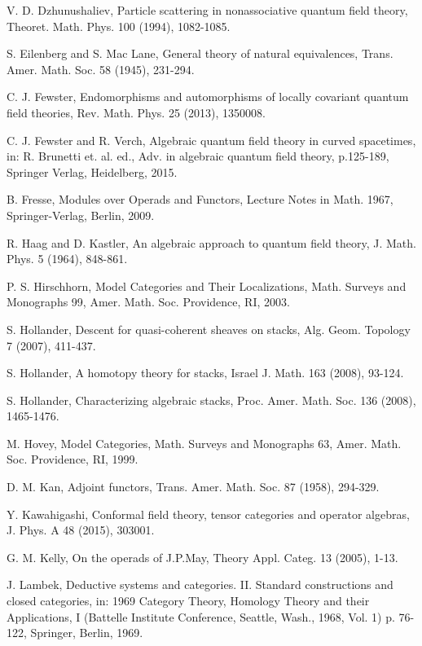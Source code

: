 \documentclass[11pt]{amsbook}
\numberwithin{section}{chapter}
\numberwithin{subsection}{section}
\numberwithin{equation}{section}
\theoremstyle{plain}
\theoremstyle{definition}
\begin{document}
\begin{thebibliography}{AAAAAA}
V. D. Dzhunushaliev, Particle scattering in nonassociative quantum field theory, Theoret. Math. Phys. 100 (1994), 1082-1085.

S. Eilenberg and S. Mac Lane, General theory of natural equivalences, Trans. Amer. Math. Soc. 58 (1945), 231-294.

C. J. Fewster, Endomorphisms and automorphisms of locally covariant quantum field theories, Rev. Math. Phys. 25 (2013), 1350008.

C. J. Fewster and R. Verch, Algebraic quantum field theory in curved spacetimes, in: R. Brunetti et. al. ed., Adv. in algebraic quantum field theory, p.125-189, Springer Verlag, Heidelberg, 2015.

B. Fresse, Modules over Operads and Functors, Lecture Notes in Math. 1967, Springer-Verlag, Berlin, 2009.

R. Haag and D. Kastler, An algebraic approach to quantum field theory, J. Math. Phys. 5 (1964), 848-861.
 
P. S. Hirschhorn, Model Categories and Their Localizations, Math. Surveys and Monographs 99, Amer. Math. Soc. Providence, RI, 2003.

S. Hollander, Descent for quasi-coherent sheaves on stacks, Alg. Geom. Topology 7 (2007), 411-437.

S. Hollander, A homotopy theory for stacks, Israel J. Math. 163 (2008), 93-124.

S. Hollander, Characterizing algebraic stacks, Proc. Amer. Math. Soc. 136 (2008), 1465-1476.

M. Hovey, Model Categories, Math. Surveys and Monographs 63, Amer. Math. Soc. Providence, RI, 1999.

D. M. Kan, Adjoint functors, Trans. Amer. Math. Soc. 87 (1958), 294-329.

Y. Kawahigashi, Conformal field theory, tensor categories and operator algebras, J. Phys. A 48 (2015), 303001.

G. M. Kelly, On the operads of J.P.May, Theory Appl. Categ. 13 (2005), 1-13.

J. Lambek, Deductive systems and categories. II. Standard constructions and
closed categories, in: 1969 Category Theory, Homology Theory and their
Applications, I (Battelle Institute Conference, Seattle, Wash., 1968, Vol. 1)
p. 76-122, Springer, Berlin, 1969.


\end{thebibliography}
\end{document}
